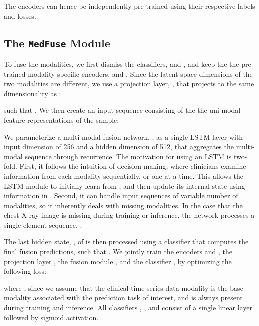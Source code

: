 \documentclass[pmlr]{jmlr}
\begin{document}
\noindent The encoders can hence be independently pre-trained using their respective labels and losses.










\subsection{The \texttt{MedFuse} Module}
\label{fusion}
To fuse the modalities, we first dismiss the classifiers,  and , and keep the the pre-trained modality-specific encoders,  and . Since the latent space dimensions of the two modalities are different, we use a projection layer, , that projects  to the same dimensionality as :

such that . We then create an input sequence consisting of the the uni-modal feature representations of the sample:

We parameterize a multi-modal fusion network, , as a single LSTM layer with input dimension of 256 and a hidden dimension of 512, that aggregates the multi-modal sequence through recurrence. The motivation for using an LSTM is two-fold. First, it follows the intuition of decision-making, where clinicians examine information from each modality sequentially, or one at a time. This allows the LSTM module to initially learn from , and then update its internal state using information in . Second, it can handle input sequences of variable number of modalities, so it inherently deals with missing modalities. In the case that the chest X-ray image is missing during training or inference, the network processes a single-element sequence, . 


The last hidden state, , of  is then processed using a classifier  that computes the final fusion predictions, such that . We jointly train the encoders  and , the projection layer , the fusion module , and the classifier , by optimizing the following loss:

where , since we assume that the clinical time-series data modality is the base modality associated with the prediction task of interest, and is always present during training and inference. All classifiers , , and  consist of a single linear layer followed by sigmoid activation. 
\end{document}
